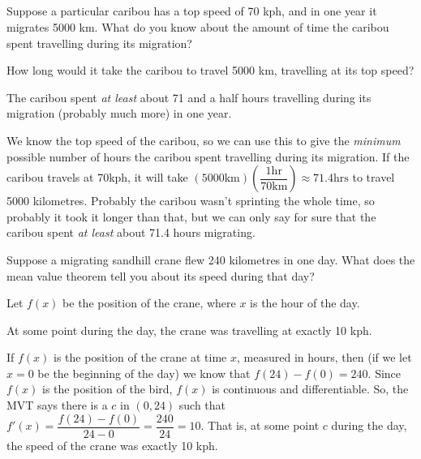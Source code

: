 %
%

\subsection*{\Conceptual}

\begin{Mquestion}
Suppose a particular caribou has a top speed of 70 kph, and in one year it migrates 5000 km. What do you know about the amount of time the caribou spent travelling during its migration?
\end{Mquestion}
\begin{hint}
How long would it take the caribou to travel 5000 km, travelling at its top speed?
\end{hint}
\begin{answer}
The caribou spent \emph{at least} about 71 and a half hours travelling during its migration (probably much more) in one year.
\end{answer}
\begin{solution}
We know the top speed of the caribou, so we can use this to give the \emph{minimum} possible number of hours the caribou spent travelling during its migration. If the caribou travels at 70kph, it will take $(5000 \mathrm{km})\left(\dfrac{1 \mathrm{hr}}{70 \mathrm{km}}\right) \approx 71.4 \mathrm{hrs}$ to travel 5000 kilometres. Probably the caribou wasn't sprinting the whole time, so probably it took it longer than that, but we can only say for sure that the caribou spent \emph{at least} about 71.4 hours migrating.
\end{solution}

\begin{Mquestion}
Suppose a migrating sandhill crane flew 240 kilometres in one day. What does the mean value theorem tell you about its speed during that day?
\end{Mquestion}
\begin{hint}
Let $f(x)$ be the position of the crane, where $x$ is the hour of the day.
\end{hint}
\begin{answer}
At some point during the day, the crane was travelling at exactly 10 kph.
\end{answer}
\begin{solution}
If $f(x)$ is the position of the crane at time $x$, measured in hours, then (if we let $x=0$ be the beginning of the day) we know that $f(24)-f(0)=240$. Since $f(x)$ is the position of the bird, $f(x)$ is continuous and differentiable. So, the MVT says there is a $c$ in $(0,24)$ such that $f'(x)=\dfrac{f(24)-f(0)}{24-0}=\dfrac{240}{24}=10$. That is, at some point $c$ during the day, the speed of the crane was exactly 10 kph.
\end{solution}


